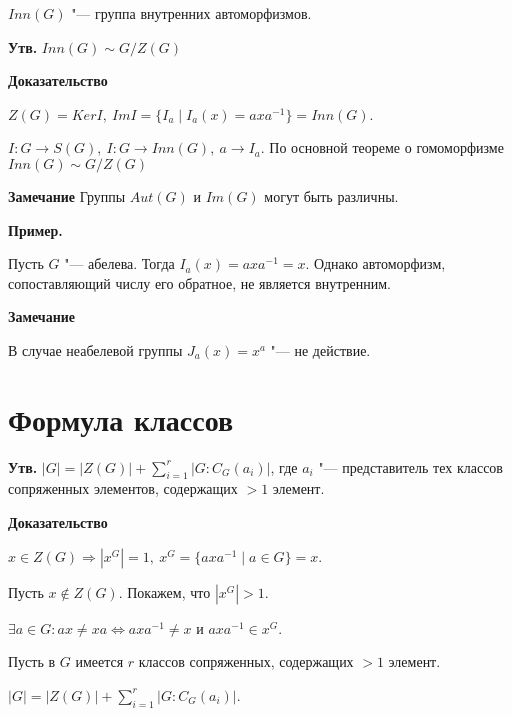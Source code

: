 \documentclass{article}
\begin{document}
\vspace{5pt}

$Inn(G)$ "--- группа внутренних автоморфизмов.

\vspace{10pt}

\textbf{Утв.}
$Inn(G) \sim G/Z(G)$

\vspace{5pt}

\textbf{Доказательство}

$Z(G) = KerI, \  ImI = \{I_a \mid I_a(x) = axa^{-1}\} =  Inn(G)$.

$I: G \rightarrow S(G), \  I: G \rightarrow Inn(G), \  a \rightarrow I_a$. По основной теореме о гомоморфизме $Inn(G) \sim G/Z(G)$

\vspace{5pt}

\textbf{Замечание} Группы $Aut(G)$ и $Im(G)$ могут быть различны.

\textbf{Пример.}

Пусть $G$ "--- абелева. Тогда $I_a(x) = axa^{-1} = x$. Однако автоморфизм, сопоставляющий числу его обратное, не является внутренним.

\vspace{5pt}

\textbf{Замечание}

В случае неабелевой группы $J_a(x) = x^a$ "--- не действие.

\section{Формула классов}

\textbf{Утв.}
$|G| = |Z(G)| + \sum \limits_{i = 1}^r |G:C_G(a_i)|$, где $a_i$ "--- представитель тех классов сопряженных элементов, содержащих $> 1$ элемент.

\vspace{5pt}

\textbf{Доказательство}

$x \in Z(G) \Rightarrow |x^G| = 1, \  x^G = \{axa^{-1} \mid a \in G\} = x$.

Пусть $x \notin Z(G)$. Покажем, что $|x^G| > 1$.

$\exists a \in G: ax \neq xa \Leftrightarrow axa^{-1} \neq x$ и $axa^{-1} \in x^G$.

Пусть в $G$ имеется $r$ классов сопряженных, содержащих $> 1$ элемент.

$|G| = |Z(G)| + \sum \limits_{i = 1}^r |G:C_G(a_i)|$. 
\end{document}
